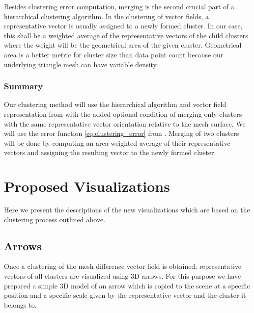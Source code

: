 Besides clustering error computation, merging is the second crucial part of a hierarchical clustering algorithm. In the clustering of vector fields, a representative vector is usually assigned to a newly formed cluster. In our case, this shall be a weighted average of the representative vectors of the child clusters where the weight will be the geometrical area of the given cluster. Geometrical area is a better metric for cluster size than data point count because our underlying triangle mesh can have variable density.

\subsubsection{Summary}

Our clustering method will use the hierarchical algorithm and vector field representation from \citet{Telea99} with the added optional condition of merging only clusters with the same representative vector orientation relative to the mesh surface. We will use the error function \ref{eq:clustering_error} from \citet{Peng12}. Merging of two clusters will be done by computing an area-weighted average of their representative vectors and assigning the resulting vector to the newly formed cluster.
\section{Proposed Visualizations}
\label{sec:analysis_visualizations}

Here we present the descriptions of the new visualizations which are based on the clustering process outlined above.

\subsection{Arrows}
\label{sec:arrow_vis}

Once a clustering of the mesh difference vector field is obtained, representative vectors of all clusters are visualized using 3D arrows. For this purpose we have prepared a simple 3D model of an arrow which is copied to the scene at a specific position and a specific scale given by the representative vector and the cluster it belongs to.

